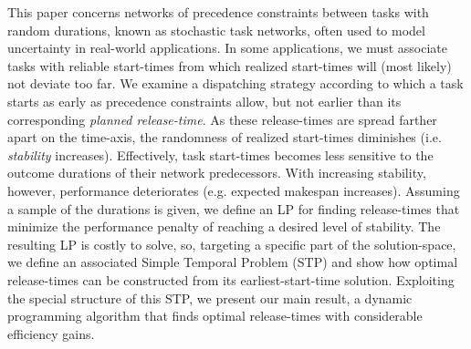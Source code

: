 This paper concerns networks of precedence constraints between tasks with random durations, 
known as stochastic task networks, often used to model uncertainty in real-world applications. 
In some applications, we must associate tasks with reliable start-times from which realized start-times will (most likely) not deviate too far.
We examine a dispatching strategy according to which a task starts as early as precedence constraints allow,
but not earlier than its corresponding \emph{planned release-time}.
As these release-times are spread farther apart on the time-axis, 
the randomness of realized start-times diminishes (i.e. \emph{stability} increases).
Effectively, task start-times becomes less sensitive to the outcome durations of their network predecessors.
With increasing stability, however, performance deteriorates (e.g. expected makespan increases).
Assuming a sample of the durations is given,
we define an LP for finding release-times that minimize the performance penalty of reaching a desired level of stability.
The resulting LP is costly to solve, so, targeting a specific part of the solution-space, 
we define an associated Simple Temporal Problem (STP) and show how optimal release-times can be constructed from its earliest-start-time solution.
Exploiting the special structure of this STP, we present our main result, 
a dynamic programming algorithm that finds optimal release-times with considerable efficiency gains.
